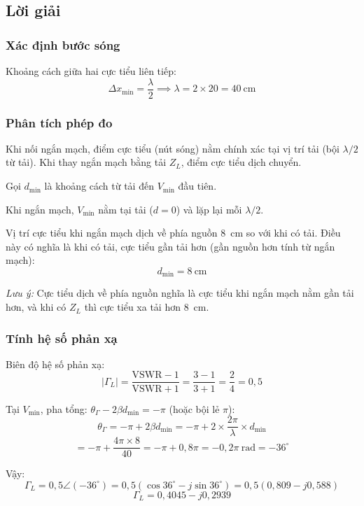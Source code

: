 \documentclass[12pt,a4paper]{article}
\begin{document}
\subsection{Lời giải}

\subsubsection{Xác định bước sóng}

Khoảng cách giữa hai cực tiểu liên tiếp:
\[
\Delta x_{\min} = \frac{\lambda}{2} \implies \lambda = 2 \times 20 = 40~\text{cm}
\]

\subsubsection{Phân tích phép đo}

Khi nối ngắn mạch, điểm cực tiểu (nút sóng) nằm chính xác tại vị trí tải (bội $\lambda/2$ từ tải). Khi thay ngắn mạch bằng tải $Z_L$, điểm cực tiểu dịch chuyển.

Gọi $d_{\min}$ là khoảng cách từ tải đến $V_{\min}$ đầu tiên.

Khi ngắn mạch, $V_{\min}$ nằm tại tải ($d = 0$) và lặp lại mỗi $\lambda/2$.

Vị trí cực tiểu khi ngắn mạch dịch về phía nguồn $8$~cm so với khi có tải. Điều này có nghĩa là khi có tải, cực tiểu gần tải hơn (gần nguồn hơn tính từ ngắn mạch):
\[
d_{\min} = 8~\text{cm}
\]

\textit{Lưu ý:} Cực tiểu dịch về phía nguồn nghĩa là cực tiểu khi ngắn mạch nằm gần tải hơn, và khi có $Z_L$ thì cực tiểu xa tải hơn $8$~cm.

\subsubsection{Tính hệ số phản xạ}

Biên độ hệ số phản xạ:
\[
|\Gamma_L| = \frac{\text{VSWR} - 1}{\text{VSWR} + 1} = \frac{3 - 1}{3 + 1} = \frac{2}{4} = 0{,}5
\]

Tại $V_{\min}$, pha tổng: $\theta_\Gamma - 2\beta d_{\min} = -\pi$ (hoặc bội lẻ $\pi$):
\[
\theta_\Gamma = -\pi + 2\beta d_{\min} = -\pi + 2 \times \frac{2\pi}{\lambda} \times d_{\min}
\]
\[
= -\pi + \frac{4\pi \times 8}{40} = -\pi + 0{,}8\pi = -0{,}2\pi~\text{rad} = -36^\circ
\]

Vậy:
\[
\Gamma_L = 0{,}5 \angle (-36^\circ) = 0{,}5(\cos 36^\circ - j\sin 36^\circ) = 0{,}5(0{,}809 - j0{,}588)
\]
\[
\Gamma_L = 0{,}4045 - j0{,}2939
\]
\end{document}
